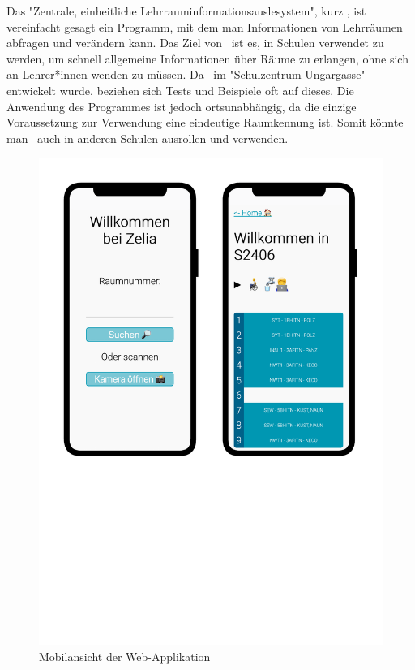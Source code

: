 

Das "Zentrale, einheitliche Lehrrauminformationsauslesystem", kurz \ZELIA, ist vereinfacht gesagt ein Programm, mit dem man Informationen von Lehrräumen abfragen und verändern kann. Das Ziel von \ZELIA\ ist es, in Schulen verwendet zu werden, um schnell allgemeine Informationen über Räume zu erlangen, ohne sich an Lehrer*innen wenden zu müssen. Da \ZELIA\ im "Schulzentrum Ungargasse" entwickelt wurde, beziehen sich Tests und Beispiele oft auf dieses. Die Anwendung des Programmes ist jedoch ortsunabhängig, da die einzige Voraussetzung zur Verwendung eine eindeutige Raumkennung ist. Somit könnte man \ZELIA\ auch in anderen Schulen ausrollen und verwenden. 

\begin{figure}[H]
    \centering
    \includegraphics[width=120mm]{media/Intro/frontend_mobile.svg.pdf}
    \caption{Mobilansicht der Web-Applikation}
\end{figure}

